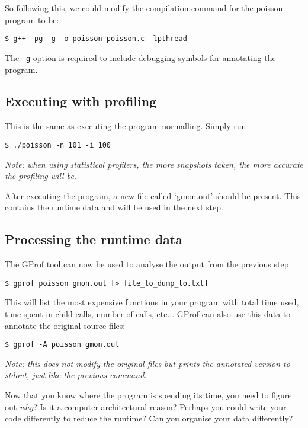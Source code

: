 \documentclass[a4paper,11pt]{article}
\begin{document}
So following this, we could modify the compilation command for the poisson
program to be:
%
\begin{verbatim}
$ g++ -pg -g -o poisson poisson.c -lpthread
\end{verbatim}
%
The \texttt{-g} option is required to include debugging symbols for annotating the program.


\subsection{Executing with profiling}

This is the same as executing the program normalling. Simply run
\begin{verbatim}
$ ./poisson -n 101 -i 100
\end{verbatim}

\emph{Note: when using statistical profilers, the more snapshots taken, the more
accurate the profiling will be.}

After executing the program, a new file called `gmon.out' should be present.
This contains the runtime data and will be used in the next step.

\subsection{Processing the runtime data}

The GProf tool can now be used to analyse the output from the previous step.

\begin{verbatim}
$ gprof poisson gmon.out [> file_to_dump_to.txt]
\end{verbatim}

This will list the most expensive functions in your program with total time
used, time spent in child calls, number of calls, etc... GProf can also use this
data to annotate the original source files:

\begin{verbatim}
$ gprof -A poisson gmon.out
\end{verbatim}

\emph{Note: this does not modify the original files but prints the annotated
version to stdout, just like the previous command.}

Now that you know where the program is spending its time, you need to figure out
\emph{why}? Is it a computer architectural reason? Perhaps you could write your
code differently to reduce the runtime? Can you organise your data differently?
\end{document}
